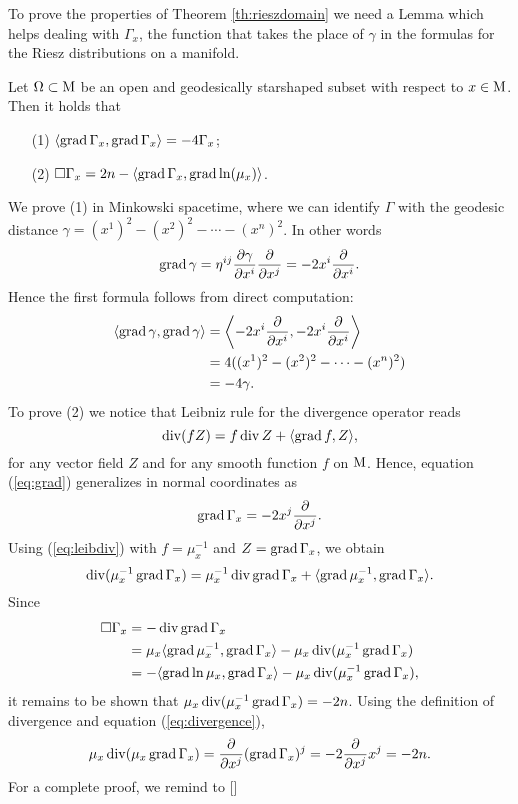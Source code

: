 \noindent To prove the properties of Theorem \ref{th:rieszdomain} we need a Lemma which helps dealing with $\Gamma_x$, the function that takes the place of $\gamma$ in the formulas for the Riesz distributions on a manifold.


\begin{lem}
	Let $\Omega\subset\mathrm{M}$ be an open and geodesically starshaped subset with respect to $x\in\mathrm{M}$. Then it holds that
	\begin{enumerate}
		\item[(1)] $\langle\operatorname{grad}\Gamma_x,\operatorname{grad}\Gamma_x\rangle=-4\Gamma_x$;
		\item[(2)] $\Box\Gamma_x=2n-\langle\operatorname{grad}\Gamma_x,\operatorname{grad}\ln(\mu_x)\rangle$.
	\end{enumerate}
\label{lem:rieszdomain}
\end{lem}
\Proof We prove (1) in Minkowski spacetime, where we can identify $\Gamma$ with the geodesic distance $\gamma=(x^1)^2-(x^2)^2-\cdots-(x^n)^2$. In other words
\begin{equation}
\operatorname{grad}\gamma=\eta^{ij}\frac{\partial \gamma}{\partial x^i}\frac{\partial }{\partial x^j}=-2x^i\frac{\partial }{\partial x^i}.
\label{eq:grad}
\end{equation}
Hence the first formula follows from direct computation:
\[	\begin{aligned}
\langle\operatorname{grad}\gamma,\operatorname{grad}\gamma\rangle&=\left\langle -2x^i\frac{\partial }{\partial x^i},-2x^i\frac{\partial }{\partial x^i}\right\rangle\\
&=4((x^1)^2-(x^2)^2-\cdots-(x^n)^2)\\
&=-4\gamma.
\end{aligned}	\]
To prove (2) we notice that Leibniz rule for the divergence operator reads
\begin{equation}
	\operatorname{div}(fZ)=f\operatorname{div} Z+\langle\operatorname{grad} f,Z\rangle,	
	\label{eq:leibdiv}
\end{equation}
for any vector field $Z$ and for any smooth function $f$ on $\mathrm{M}$. Hence, equation (\ref{eq:grad}) generalizes in normal coordinates as
\[	\operatorname{grad}\Gamma_x=-2x^j\frac{\partial }{\partial x^j}.	\]
Using (\ref{eq:leibdiv}) with $f=\mu_x^{-1}$ and $Z=\operatorname{grad}\Gamma_x$, we obtain
\[	\operatorname{div}(\mu_x^{-1}\operatorname{grad}\Gamma_x)=\mu_x^{-1}\operatorname{div}\operatorname{grad}\Gamma_x+\langle\operatorname{grad}\mu_x^{-1},\operatorname{grad}\Gamma_x\rangle.		\]
Since
\[	\begin{aligned}
\Box\Gamma_x&=-\operatorname{div}\operatorname{grad}\Gamma_x\\
&=\mu_x\langle\operatorname{grad}\mu_x^{-1},\operatorname{grad}\Gamma_x\rangle-\mu_x\operatorname{div}(\mu_x^{-1}\operatorname{grad}\Gamma_x)\\
&=-\langle\operatorname{grad}\ln\mu_x,\operatorname{grad}\Gamma_x\rangle-\mu_x\operatorname{div}(\mu_x^{-1}\operatorname{grad}\Gamma_x),
\end{aligned}		\]
it remains to be shown that $\mu_x\operatorname{div}(\mu_x^{-1}\operatorname{grad}\Gamma_x)=-2n$.
Using the definition of divergence and equation (\ref{eq:divergence}),
\[	\mu_x\operatorname{div}(\mu_x\operatorname{grad}\Gamma_x)=\frac{\partial }{\partial x^j}(\operatorname{grad}\Gamma_x)^j=-2\frac{\partial }{\partial x^j}x^j=-2n.		\]
For a complete proof, we remind to [\citealp[Lem 1.3.19]{bar1}]
\endproof\\

